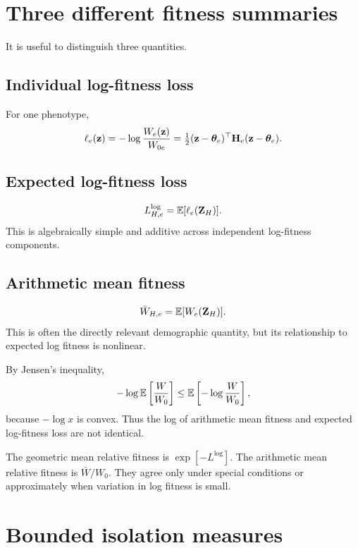 \section{Three different fitness summaries}

It is useful to distinguish three quantities.

\subsection{Individual log-fitness loss}
For one phenotype,
\begin{equation}
\ell_e(\mathbf z)
=-\log\frac{W_e(\mathbf z)}{W_{0e}}
=\tfrac12(\mathbf z-\boldsymbol{\theta}_e)^\top\mathbf{H}_e(\mathbf z-\boldsymbol{\theta}_e).
\end{equation}

\subsection{Expected log-fitness loss}
\begin{equation}
L^{\log}_{H,e}=\mathbb E[\ell_e(\mathbf Z_H)].
\end{equation}
This is algebraically simple and additive across independent log-fitness components.

\subsection{Arithmetic mean fitness}
\begin{equation}
\bar W_{H,e}=\mathbb E[W_e(\mathbf Z_H)].
\end{equation}
This is often the directly relevant demographic quantity, but its relationship to expected log fitness is nonlinear.

By Jensen's inequality,
\begin{equation}
-\log\mathbb E\left[\frac{W}{W_0}\right]
\le
\mathbb E\left[-\log\frac{W}{W_0}\right],
\end{equation}
because \(-\log x\) is convex. Thus the log of arithmetic mean fitness and expected log-fitness loss are not identical.

\begin{mathteach}
The geometric mean relative fitness is \(\exp[-L^{\log}]\). The arithmetic mean relative fitness is \(\bar W/W_0\). They agree only under special conditions or approximately when variation in log fitness is small.
\end{mathteach}

\section{Bounded isolation measures}

